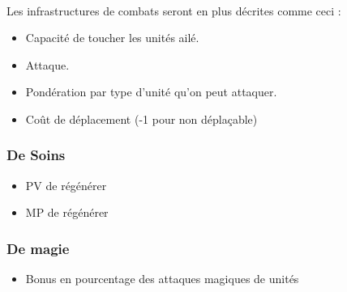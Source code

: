 \paragraph{} Les infrastructures de combats seront en plus décrites comme ceci :
\begin{itemize}
	\item Capacité de toucher les unités ailé.
	\item Attaque.
	\item Pondération par type d'unité qu'on peut attaquer.
	\item Coût de déplacement (-1 pour non déplaçable)
\end{itemize}

\subsubsection{De Soins}
\begin{itemize}
	\item PV de régénérer
	\item MP de régénérer
\end{itemize}

\subsubsection{De magie}
\begin{itemize}
	\item Bonus en pourcentage des attaques magiques de unités
\end{itemize}
